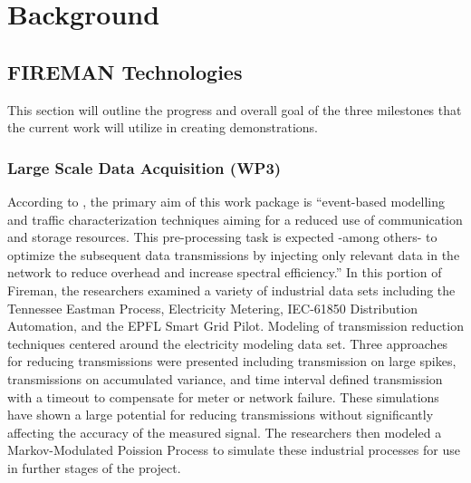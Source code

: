 \section{Background}

\subsection{FIREMAN Technologies}

This section will outline the progress and overall goal of the three milestones that the current work will utilize in creating demonstrations.

\subsubsection{Large Scale Data Acquisition (WP3)}

According to \cite{wp3.1}, the primary aim of this work package is ``event-based modelling and traffic characterization techniques aiming for a reduced use of communication and storage resources. This pre-processing task is expected -among others- to optimize the subsequent data transmissions by injecting only relevant data in the network to reduce overhead and increase spectral efficiency.'' In this portion of Fireman, the researchers examined a  variety of industrial data sets including the Tennessee Eastman Process, Electricity Metering, IEC-61850 Distribution Automation, and the EPFL Smart Grid Pilot. Modeling of transmission reduction techniques centered around the electricity modeling data set. Three approaches for reducing transmissions were presented including transmission on large spikes, transmissions on accumulated variance, and time interval defined transmission with a timeout to compensate for meter or network failure. These simulations have shown a large potential for reducing transmissions without significantly affecting the accuracy of the measured signal. The researchers then modeled a Markov-Modulated Poission Process to simulate these industrial processes for use in further stages of the project.

